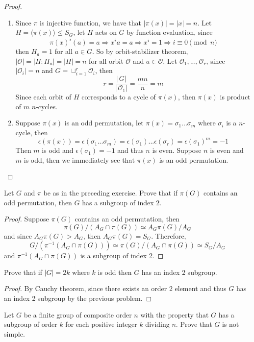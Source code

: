 \documentclass{article}
\newcommand{\orbit}{\mathcal{O}}
\newenvironment{problem}[2][Problem]{\begin{trivlist}
\item[\hskip \labelsep {\bfseries #1}\hskip \labelsep {\bfseries #2.}]}{\end{trivlist}}
\begin{document}
\begin{proof}
\begin{enumerate}
    \item 
    Since $\pi$ is injective function, we have that $|\pi(x)|=|x|=n$. Let $H=\langle \pi(x) \rangle \leq S_G$, let $H$ acts on $G$ by function evaluation, since 
    \[
        \pi(x)^i(a)=a \Rightarrow x^ia = a \Rightarrow x^i=1 \Rightarrow i  \equiv 0  \pmod n
    \]
    then $H_a =1$ for all $a \in G$. So by orbit-stabilizer theorem, $|\orbit| = |H:H_a|=|H|=n$ for all orbit $\orbit$ and $a \in \orbit$. Let $\orbit_1, ..., \orbit_r$, since $|\orbit_i|=n$ and $G = \sqcup_{i=1}^r \orbit_i$, then \[r=\frac{|G|}{|\orbit_1|}=\frac{mn}{n}=m\]
    Since each orbit of $H$ corresponds to a cycle of $\pi(x)$, then $\pi(x)$ is product of $m$ $n$-cycles.\\
    \item Suppose $\pi(x)$ is an odd permutation, let $\pi(x)=\sigma_1...\sigma_m$ where $\sigma_i$ is a $n$-cycle, then 
    \[
    \epsilon(\pi(x))=\epsilon(\sigma_1...\sigma_m)=\epsilon(\sigma_1)...\epsilon(\sigma_r)=\epsilon(\sigma_1)^m =-1
    \]
    Then $m$ is odd and $\epsilon(\sigma_1)=-1$ and thus $n$ is even. Suppose $n$ is even and $m$ is odd, then we immediately see that $\pi(x)$ is an odd permutation.
\end{enumerate}
\end{proof}
\begin{problem}{12}
    Let $G$ and $\pi$ be as in the preceding exercise. Prove that if $\pi(G)$ contains an odd permutation, then $G$ has a subgroup of index $2$.
\end{problem}
\begin{proof}
    Suppose $\pi(G)$ contains an odd permutation, then 
    \[
        \pi(G)/(A_G\cap \pi(G)) \simeq A_G\pi(G)/A_G
    \]
    and since $A_G\pi(G)>A_G$, then $A_G\pi(G)=S_G$. Therefore, 
    \[
    G/(\pi^{-1}(A_G\cap \pi(G)))\simeq \pi(G)/(A_G\cap \pi(G)) \simeq S_G/A_G
    \]
    and $\pi^{-1}(A_G\cap \pi(G))$ is a subgroup of index 2.
\end{proof}
\begin{problem}{13}
    Prove that if $|G|=2k$ where $k$ is odd then $G$ has an index $2$ subgroup.
\end{problem}
\begin{proof}
    By Cauchy theorem, since there exists an order $2$ element and thus $G$ has an index 2 subgroup by the previous problem.
\end{proof}
\begin{problem}{14}
    Let $G$ be a finite group of composite order $n$ with the property that $G$ has a subgroup of order $k$ for each positive integer $k$ dividing $n$. Prove that $G$ is not simple.
\end{problem}
\end{document}
